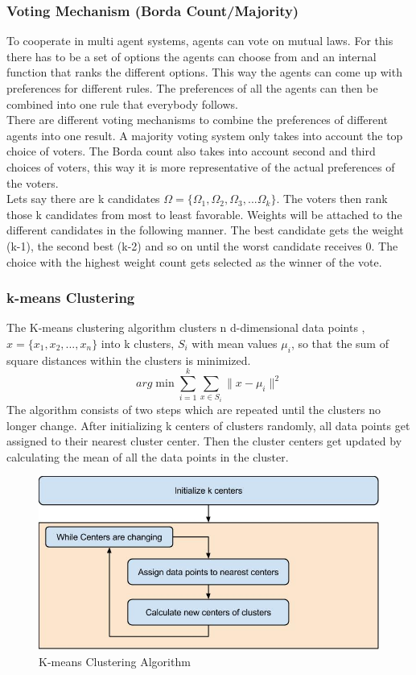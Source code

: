\documentclass[a4paper]{article}
\begin{document}
\subsubsection{Voting Mechanism (Borda Count/Majority)}
To cooperate in multi agent systems, agents can vote on mutual laws.  For this there has to be a set of
options the agents can choose from and an internal function that ranks the different options. This way the agents 
can come up with preferences for different rules. The preferences of all the agents can then be combined into one rule 
that everybody follows.\\
There are different voting mechanisms to combine the preferences of different agents into one result.
A majority voting system only takes into account the top choice of voters. The Borda count also takes into account 
second and third choices of voters, this way it is more representative of the actual preferences of the voters. \\
Lets say there are k candidates $\Omega = \{\Omega_1 , \Omega_2,\Omega_3,... \Omega_k\}$. The voters then rank those k 
candidates from most to least favorable. Weights will be attached to the different candidates in the following manner. 
The best candidate gets the weight (k-1), the second best (k-2) and so on until the worst candidate receives 0. The choice 
with the highest weight count gets selected as the winner of the vote.\cite{mas} \\
\subsubsection{k-means  Clustering}
The K-means clustering algorithm clusters n d-dimensional data points ,$x=\{ x_1,x_2,..., x_n\}$ into k clusters, $S_i$ with mean values $\mu_i$, so that the sum of square distances within the clusters is minimized. 
\begin{equation}
arg \min \sum_{i=1}^k \sum_{x \in S_i}\| x- \mu_i \|^2
\end{equation}
The algorithm consists of two steps which are repeated until the clusters no longer change. After initializing k centers of clusters randomly, all data points get assigned to their nearest cluster center. Then the cluster centers get updated by calculating the mean of all the data points in the cluster. 
\begin{figure}[!ht]
\includegraphics[width =\textwidth]{K-means_alg.jpg}
\caption{K-means Clustering Algorithm}
\label{k-means_picture}
\end{figure}
\end{document}
